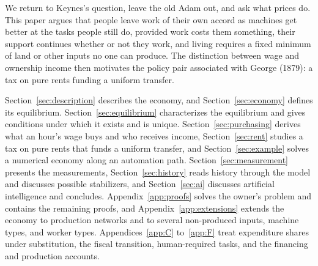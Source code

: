 \documentclass[12pt]{article}
\theoremstyle{plain}
\theoremstyle{definition}
\theoremstyle{remark}
\begin{document}
We return to Keynes's question, leave the old Adam out, and ask what prices do. This paper argues
that people leave work of their own accord as machines get better at the tasks people still do,
provided work costs them something, their support continues whether or not they work, and living
requires a fixed minimum of land or other inputs no one can produce.
The distinction between wage and ownership income then motivates the policy pair associated with George (1879): a tax on pure rents funding a uniform transfer.

Section~\ref{sec:description} describes the economy, and Section~\ref{sec:economy} defines its
equilibrium. Section~\ref{sec:equilibrium} characterizes the equilibrium and gives conditions under
which it exists and is unique. Section~\ref{sec:purchasing} derives what an hour's wage buys and who
receives income, Section~\ref{sec:rent} studies a tax on pure rents that funds a uniform transfer,
and Section~\ref{sec:example} solves a numerical economy along an automation path.
Section~\ref{sec:measurement} presents the measurements, Section~\ref{sec:history} reads history
through the model and discusses possible stabilizers, and Section~\ref{sec:ai} discusses artificial
intelligence and concludes. Appendix~\ref{app:proofs} solves the owner's problem and contains the
remaining proofs, and Appendix~\ref{app:extensions} extends the economy to production networks
and to several non-produced inputs, machine types, and worker types. Appendices~\ref{app:C}
to~\ref{app:F} treat expenditure shares under substitution, the fiscal transition, human-required
tasks, and the financing and production accounts.

\end{document}
